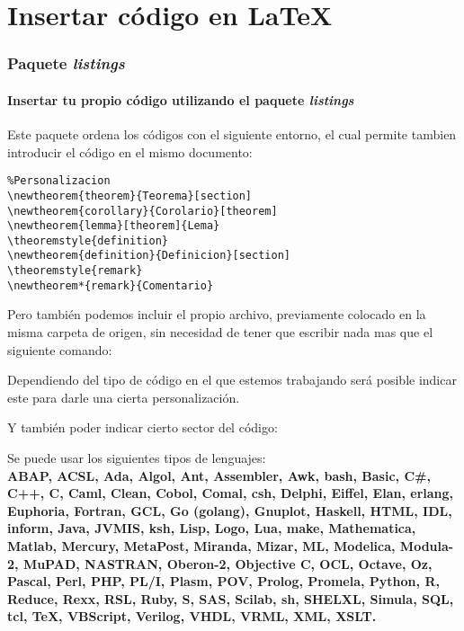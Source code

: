 \documentclass[12pt,a4paper]{article}
\begin{document}
\maketitle
\newpage
\tableofcontents
\newpage

\newpage

\newpage

\newpage

\newpage
\part{Insertar código en \LaTeX}
\section{Paquete \textit{listings}}
\subsection*{Insertar tu propio código utilizando el paquete \textit{listings}}
Este paquete ordena los códigos con el siguiente entorno, el cual permite tambien introducir el código en el mismo documento:
\begin{lstlisting}
%Personalizacion
\newtheorem{theorem}{Teorema}[section]
\newtheorem{corollary}{Corolario}[theorem]
\newtheorem{lemma}[theorem]{Lema}
\theoremstyle{definition}
\newtheorem{definition}{Definicion}[section]
\theoremstyle{remark}
\newtheorem*{remark}{Comentario}
\end{lstlisting}
Pero también podemos incluir el propio archivo, previamente colocado en la misma carpeta de origen, sin necesidad de tener que escribir nada mas que el siguiente comando:

Dependiendo del tipo de código en el que estemos trabajando será posible indicar este para darle una cierta personalización.

Y también poder indicar cierto sector del código:

Se puede usar los siguientes tipos de lenguajes:\\
{\bf ABAP, ACSL, Ada, Algol, Ant, Assembler, Awk, bash, Basic, C\#, C++, C, Caml, Clean, Cobol, Comal, csh, Delphi, Eiffel, Elan, erlang, Euphoria, Fortran, GCL, Go (golang), Gnuplot, Haskell, HTML, IDL, inform, Java, JVMIS, ksh, Lisp, Logo, Lua, make, Mathematica, Matlab, Mercury, MetaPost, Miranda, Mizar, ML, Modelica, Modula-2, MuPAD, NASTRAN, Oberon-2, Objective C, OCL, Octave, Oz, Pascal, Perl, PHP, PL/I, Plasm, POV, Prolog, Promela, Python, R, Reduce, Rexx, RSL, Ruby, S, SAS, Scilab, sh, SHELXL, Simula, SQL, tcl, TeX, VBScript, Verilog, VHDL, VRML, XML, XSLT.}
\end{document}
